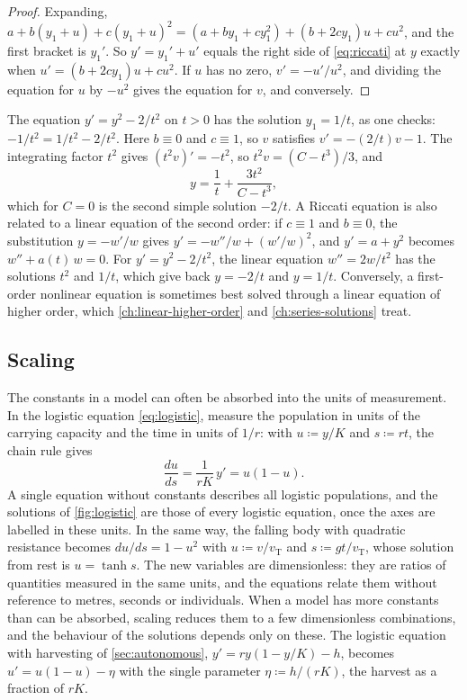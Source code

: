 \begin{proof}
Expanding, $a+b(y_1+u)+c(y_1+u)^2=(a+by_1+cy_1^2)+(b+2cy_1)u+cu^2$, and the first bracket is $y_1'$. So $y'=y_1'+u'$ equals the right side of \eqref{eq:riccati} at $y$ exactly when $u'=(b+2cy_1)u+cu^2$. If $u$ has no zero, $v'=-u'/u^2$, and dividing the equation for $u$ by $-u^2$ gives the equation for $v$, and conversely.
\end{proof}

The equation $y'=y^2-2/t^2$ on $t>0$ has the solution $y_1=1/t$, as one checks: $-1/t^2=1/t^2-2/t^2$. Here $b\equiv0$ and $c\equiv1$, so $v$ satisfies $v'=-(2/t)v-1$. The integrating factor $t^2$ gives $(t^2v)'=-t^2$, so $t^2v=(C-t^3)/3$, and
\[
y=\frac1t+\frac{3t^2}{C-t^3} ,
\]
which for $C=0$ is the second simple solution $-2/t$. A Riccati equation is also related to a linear equation of the second order: if $c\equiv1$ and $b\equiv0$, the substitution $y=-w'/w$ gives $y'=-w''/w+(w'/w)^2$, and $y'=a+y^2$ becomes $w''+a(t)\,w=0$. For $y'=y^2-2/t^2$, the linear equation $w''=2w/t^2$ has the solutions $t^2$ and $1/t$, which give back $y=-2/t$ and $y=1/t$. Conversely, a first-order nonlinear equation is sometimes best solved through a linear equation of higher order, which \cref{ch:linear-higher-order} and \cref{ch:series-solutions} treat.

\subsection{Scaling}

The constants in a model can often be absorbed into the units of measurement. In the logistic equation \eqref{eq:logistic}, measure the population in units of the carrying capacity and the time in units of $1/r$: with $u\coloneqq y/K$ and $s\coloneqq rt$, the chain rule gives
\[
\frac{du}{ds}=\frac1{rK}\,y'=u(1-u) .
\]
A single equation without constants describes all logistic populations, and the solutions of \cref{fig:logistic} are those of every logistic equation, once the axes are labelled in these units. In the same way, the falling body with quadratic resistance becomes $du/ds=1-u^2$ with $u\coloneqq v/v_{\mathrm T}$ and $s\coloneqq gt/v_{\mathrm T}$, whose solution from rest is $u=\tanh s$. The new variables are dimensionless: they are ratios of quantities measured in the same units, and the equations relate them without reference to metres, seconds or individuals. When a model has more constants than can be absorbed, scaling reduces them to a few dimensionless combinations, and the behaviour of the solutions depends only on these. The logistic equation with harvesting of \cref{sec:autonomous}, $y'=ry(1-y/K)-h$, becomes $u'=u(1-u)-\eta$ with the single parameter $\eta\coloneqq h/(rK)$, the harvest as a fraction of $rK$.

